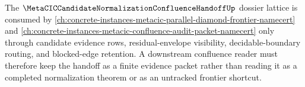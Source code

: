 The $\MetaCICCandidateNormalizationConfluenceHandoffUp$ dossier lattice is consumed by \autoref{ch:concrete-instances-metacic-parallel-diamond-frontier-namecert} and \autoref{ch:concrete-instances-metacic-confluence-audit-packet-namecert} only through candidate evidence rows, residual-envelope visibility, decidable-boundary routing, and blocked-edge retention. A downstream confluence reader must therefore keep the handoff as a finite evidence packet rather than reading it as a completed normalization theorem or as an untracked frontier shortcut.
